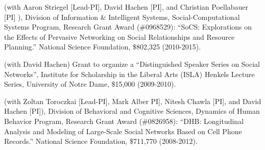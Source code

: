  (with Aaron Striegel [Lead-PI], David Hachen [PI], and Christian Poellabauer [PI] ), Division of Information \& Intelligent Systems, Social-Computational Systems Program, Research Grant Award (\#0968529): ``SoCS:  Explorations on the Effects of Pervasive Networking on Social Relationships and Resource Planning.'' National Science Foundation, \$802,325 (2010-2015).

 (with David Hachen) Grant to organize a ``Distinguished Speaker Series on Social Networks”, Institute for Scholarship in the Liberal Arts (ISLA) Henkels Lecture Series, University of Notre Dame, \$15,000 (2009-2010).

 (with Zoltan Toroczkai [Lead-PI], Mark Alber PI], Nitesh Chawla [PI], and David Hachen [PI]), Division of Behavioral and Cognitive Sciences, Dynamics of Human Behavior Program, Research Grant Award (\#0826958): ``DHB: Longitudinal Analysis and Modeling of Large-Scale Social Networks Based on Cell Phone Records.''  National Science Foundation, \$711,770 (2008-2012).

